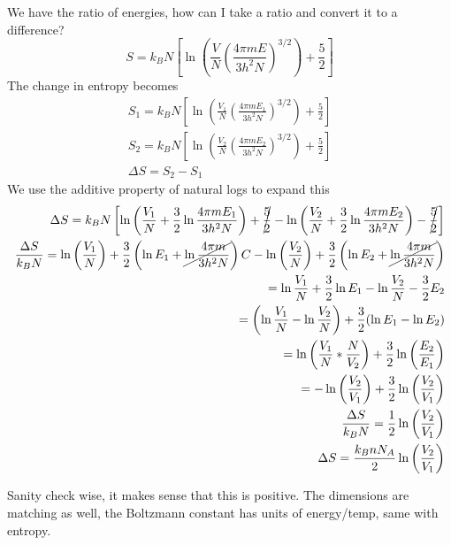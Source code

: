 \documentclass[]{article}
\begin{document}
We have the ratio of energies, how can I take a ratio and convert it to
a difference?
\[ S = k_B N\left[\ln \left(\frac{V}{N}\left(\frac{4\pi m E}{3h^2 N}\right)^{3/2}\right) + \frac{5}{2}\right]\]
The change in entropy becomes \[
\begin{align}
 S_{1} = k_B N\left[\ln \left(\frac{V_{1}}{N}\left(\frac{4\pi m E_{1}}{3h^2 N}\right)^{3/2}\right) + \frac{5}{2}\right] \\
 S_{2} = k_B N\left[\ln \left(\frac{V_{2}}{N}\left(\frac{4\pi m E_{2}}{3h^2 N}\right)^{3/2}\right) + \frac{5}{2}\right] \\
\Delta S = S_{2}-S_{1}
\end{align}
\] We use the additive property of natural logs to expand this \[
\begin{align}
\Delta S = k_{B}N\left[ \ln\left( \frac{V_{1}}{N}+\frac{3}{2} \ln \frac{4\pi mE_{1}}{3h^{2}N}\right) +\cancel{ \frac{5}{2} }-\ln\left( \frac{V_{2}}{N}+\frac{3}{2} \ln \frac{4\pi mE_{2}}{3h^{2}N}\right) -\cancel{ \frac{5}{2} }\right]  \\
\frac{\Delta S}{k_{B}N} = \ln\left( \frac{V_{1}}{N} \right) + \frac{3}{2}\left( \ln E_{1}+\cancel{ \ln\frac{{4}\pi m}{3h^{2}N} } \right)C -\ln\left( \frac{V_{2}}{N} \right) + \frac{3}{2}\left( \ln E_{2}+\cancel{ \ln\frac{{4}\pi m}{3h^{2}N} } \right) \\
=\ln \frac{V_{1}}{N}+\frac{3}{2}\ln E_{1}-\ln \frac{V_{2}}{N}-\frac{3}{2}E_{2} \\
=\left( \ln \frac{V_{1}}{N}-\ln \frac{V_{2}}{N} \right)+\frac{3}{2}(\ln E_{1}-\ln E_{2}) \\
= \ln \left( \frac{V_{1}}{N}* \frac{N}{V_{2}} \right) +\frac{3}{2}\ln\left( \frac{E_{2}}{E_{1}} \right) \\
= -\ln\left( \frac{V_{2}}{V_{1}} \right)+\frac{3}{2}\ln\left( \frac{V_{2}}{V_{1}} \right) \\
\frac{\Delta S}{k_{B}N}=\frac{1}{2}\ln\left( \frac{V_{2}}{V_{1}} \right) \\
\Delta S = \frac{k_{B}nN_{A}}{2}\ln\left( \frac{V_{2}}{V_{1}} \right)
\end{align}
\]

Sanity check wise, it makes sense that this is positive. The dimensions
are matching as well, the Boltzmann constant has units of energy/temp,
same with entropy.
\end{document}
